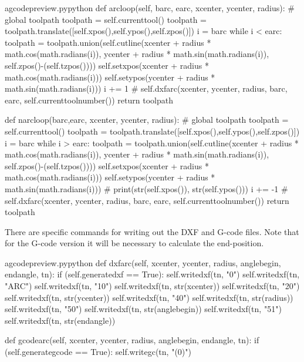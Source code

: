 \documentclass{ltxdoc}
\begin{document}
\lstset{firstnumber=\thegcpy}
\begin{writecode}{a}{gcodepreview.py}{python}
    def arcloop(self, barc, earc, xcenter, ycenter, radius):
#        global toolpath
        toolpath = self.currenttool()
        toolpath = toolpath.translate([self.xpos(),self.ypos(),self.zpos()])
        i = barc
        while i < earc: 
            toolpath = toolpath.union(self.cutline(xcenter + radius * math.cos(math.radians(i)), ycenter + radius * math.sin(math.radians(i)), self.zpos()-(self.tzpos())))
            self.setxpos(xcenter + radius * math.cos(math.radians(i)))
            self.setypos(ycenter + radius * math.sin(math.radians(i)))
            i += 1
#        self.dxfarc(xcenter, ycenter, radius, barc, earc, self.currenttoolnumber())
        return toolpath

    def narcloop(barc,earc, xcenter, ycenter, radius):
#        global toolpath
        toolpath = self.currenttool()
        toolpath = toolpath.translate([self.xpos(),self.ypos(),self.zpos()])
        i = barc
        while i > earc: 
            toolpath = toolpath.union(self.cutline(xcenter + radius * math.cos(math.radians(i)), ycenter + radius * math.sin(math.radians(i)), self.zpos()-(self.tzpos())))
            self.setxpos(xcenter + radius * math.cos(math.radians(i)))
            self.setypos(ycenter + radius * math.sin(math.radians(i)))
#            print(str(self.xpos()), str(self.ypos()))
            i += -1
#        self.dxfarc(xcenter, ycenter, radius, barc, earc, self.currenttoolnumber())
        return toolpath

\end{writecode}
\addtocounter{gcpy}{27}

There are specific commands for writing out the DXF and G-code files. Note that for the G-code version it will be necessary to calculate the end-position.

\lstset{firstnumber=\thegcpy}
\begin{writecode}{a}{gcodepreview.py}{python}
    def dxfarc(self, xcenter, ycenter, radius, anglebegin, endangle, tn):
        if (self.generatedxf == True):
            self.writedxf(tn, "0")
            self.writedxf(tn, "ARC")
            self.writedxf(tn, "10")
            self.writedxf(tn, str(xcenter))
            self.writedxf(tn, "20")
            self.writedxf(tn, str(ycenter))
            self.writedxf(tn, "40")
            self.writedxf(tn, str(radius))
            self.writedxf(tn, "50")
            self.writedxf(tn, str(anglebegin))
            self.writedxf(tn, "51")
            self.writedxf(tn, str(endangle))

    def gcodearc(self, xcenter, ycenter, radius, anglebegin, endangle, tn):
        if (self.generategcode == True):
            self.writegc(tn, "(0)")

\end{writecode}
\addtocounter{gcpy}{19}
\end{document}
